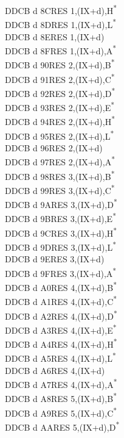\documentclass[twoside,openright,a4paper]{book}
\begin{document}
\begin{multicols}{3}
{\begin{tabbing}
	DDCB d 8C\>RES 1,(IX+d),H\textsuperscript{*}\\
	DDCB d 8D\>RES 1,(IX+d),L\textsuperscript{*}\\
	DDCB d 8E\>RES 1,(IX+d)\\
	DDCB d 8F\>RES 1,(IX+d),A\textsuperscript{*}\\
	DDCB d 90\>RES 2,(IX+d),B\textsuperscript{*}\\
	DDCB d 91\>RES 2,(IX+d),C\textsuperscript{*}\\
	DDCB d 92\>RES 2,(IX+d),D\textsuperscript{*}\\
	DDCB d 93\>RES 2,(IX+d),E\textsuperscript{*}\\
	DDCB d 94\>RES 2,(IX+d),H\textsuperscript{*}\\
	DDCB d 95\>RES 2,(IX+d),L\textsuperscript{*}\\
	DDCB d 96\>RES 2,(IX+d)\\
	DDCB d 97\>RES 2,(IX+d),A\textsuperscript{*}\\
	DDCB d 98\>RES 3,(IX+d),B\textsuperscript{*}\\
	DDCB d 99\>RES 3,(IX+d),C\textsuperscript{*}\\
	DDCB d 9A\>RES 3,(IX+d),D\textsuperscript{*}\\
	DDCB d 9B\>RES 3,(IX+d),E\textsuperscript{*}\\
	DDCB d 9C\>RES 3,(IX+d),H\textsuperscript{*}\\
	DDCB d 9D\>RES 3,(IX+d),L\textsuperscript{*}\\
	DDCB d 9E\>RES 3,(IX+d)\\
	DDCB d 9F\>RES 3,(IX+d),A\textsuperscript{*}\\
	DDCB d A0\>RES 4,(IX+d),B\textsuperscript{*}\\
	DDCB d A1\>RES 4,(IX+d),C\textsuperscript{*}\\
	DDCB d A2\>RES 4,(IX+d),D\textsuperscript{*}\\
	DDCB d A3\>RES 4,(IX+d),E\textsuperscript{*}\\
	DDCB d A4\>RES 4,(IX+d),H\textsuperscript{*}\\
	DDCB d A5\>RES 4,(IX+d),L\textsuperscript{*}\\
	DDCB d A6\>RES 4,(IX+d)\\
	DDCB d A7\>RES 4,(IX+d),A\textsuperscript{*}\\
	DDCB d A8\>RES 5,(IX+d),B\textsuperscript{*}\\
	DDCB d A9\>RES 5,(IX+d),C\textsuperscript{*}\\
	DDCB d AA\>RES 5,(IX+d),D\textsuperscript{*}\\

\end{tabbing}}
\end{multicols}
\end{document}
